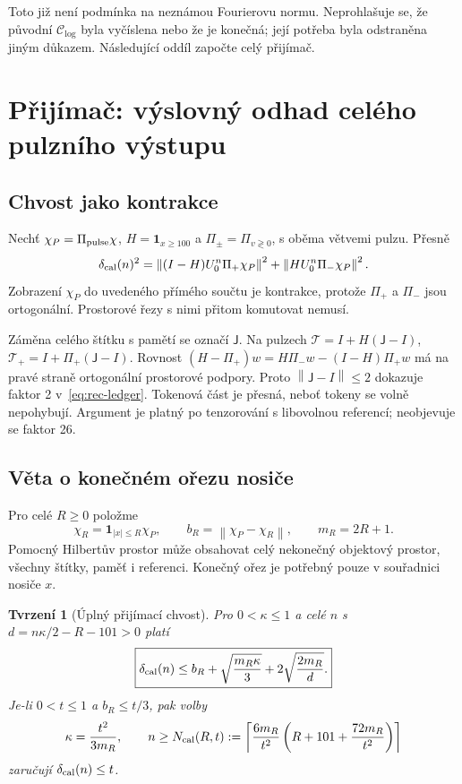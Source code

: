 \documentclass[11pt,a4paper]{article}
\newcommand{\norm}[1]{\left\lVert#1\right\rVert}
\newcommand{\ind}{\mathbf1}
\newcommand{\Tcal}{\mathcal T}
\newtheorem{theorem}{Tvrzení}[section]
\theoremstyle{remark}\newtheorem{remark}[theorem]{Poznámka}
\numberwithin{equation}{section}
\begin{document}
Toto již není podmínka na neznámou Fourierovu normu. Neprohlašuje se, že původní \(\mathcal C_{\log}\) byla vyčíslena nebo že je konečná; její potřeba byla odstraněna jiným důkazem. Následující oddíl započte celý přijímač.
\section{Přijímač: výslovný odhad celého pulzního výstupu}
\label{sec:receiver}

\subsection{Chvost jako kontrakce}

Nechť \(\chi_P=\Pi_{\rm pulse}\chi\), \(H=\ind_{x\ge100}\) a
\(\Pi_\pm=\Pi_{v\gtrless0}\), s oběma větvemi pulzu. Přesně
\begin{equation}
\delta_{\rm cal}(n)^2
=\norm{(I-H)U_0^n\Pi_+\chi_P}^2
+\norm{HU_0^n\Pi_-\chi_P}^2.
\label{eq:caldef}
\end{equation}
Zobrazení \(\chi_P\) do uvedeného přímého součtu je kontrakce, protože \(\Pi_+\) a \(\Pi_-\) jsou ortogonální. Prostorové řezy s nimi přitom komutovat nemusí.

Záměna celého štítku s pamětí se označí \(\mathsf J\). Na pulzech
\(\Tcal=I+H(\mathsf J-I)\), \(\Tcal_+=I+\Pi_+(\mathsf J-I)\).
Rovnost
\((H-\Pi_+)w=H\Pi_-w-(I-H)\Pi_+w\)
má na pravé straně ortogonální prostorové podpory. Proto \(\norm{\mathsf J-I}\le2\) dokazuje faktor 2 v~\eqref{eq:rec-ledger}. Tokenová část je přesná, neboť tokeny se volně nepohybují. Argument je platný po tenzorování s libovolnou referencí; neobjevuje se faktor 26.

\subsection{Věta o konečném ořezu nosiče}

Pro celé \(R\ge0\) položme
\[
\chi_R=\ind_{|x|\le R}\chi_P,\qquad
b_R=\norm{\chi_P-\chi_R},\qquad m_R=2R+1.
\]
Pomocný Hilbertův prostor může obsahovat celý nekonečný objektový prostor, všechny štítky, paměť i referenci. Konečný ořez je potřebný pouze v souřadnici nosiče \(x\).

\begin{theorem}[Úplný přijímací chvost]
Pro \(0<\kappa\le1\) a celé \(n\) s
\(d=n\kappa/2-R-101>0\) platí
\begin{equation}
\boxed{\delta_{\rm cal}(n)\le b_R+
\sqrt{\frac{m_R\kappa}{3}}+2\sqrt{\frac{2m_R}{d}}.}
\label{eq:receiver-bound}
\end{equation}
Je-li \(0<t\le1\) a \(b_R\le t/3\), pak volby
\begin{equation}
\kappa=\frac{t^2}{3m_R},\qquad
n\ge N_{\rm cal}(R,t):=
\left\lceil\frac{6m_R}{t^2}
\left(R+101+\frac{72m_R}{t^2}\right)\right\rceil
\label{eq:Ncal}
\end{equation}
zaručují \(\delta_{\rm cal}(n)\le t\).
\end{theorem}
\end{document}
